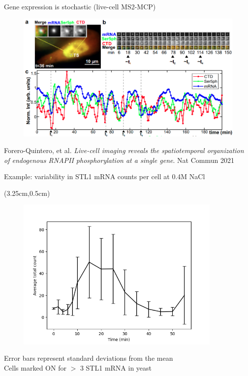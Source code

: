 \documentclass[aspectratio=1610]{beamer}					%
\begin{document}
\begin{frame}{Gene expression is stochastic (live-cell MS2-MCP)}
\begin{figure}
\includegraphics[width=12cm]{live-cell.png}
\end{figure}
{\tiny Forero-Quintero, et al. \textit{Live-cell imaging reveals the spatiotemporal organization of endogenous RNAPII phosphorylation at a single gene}. Nat Commun 2021}\\
\end{frame}



\begin{frame}{Example: variability in STL1 mRNA counts per cell at 0.4M NaCl}

\begin{textblock*}{5cm}(3.25cm,0.5cm)
\begin{figure}
\includegraphics[width=10cm]{avg-count.png}
\end{figure}
\end{textblock*}

\vspace{7.25cm}
Error bars represent standard deviations from the mean\\
Cells marked ON for $>$ 3 STL1 mRNA in yeast

\end{frame}
\end{document}

